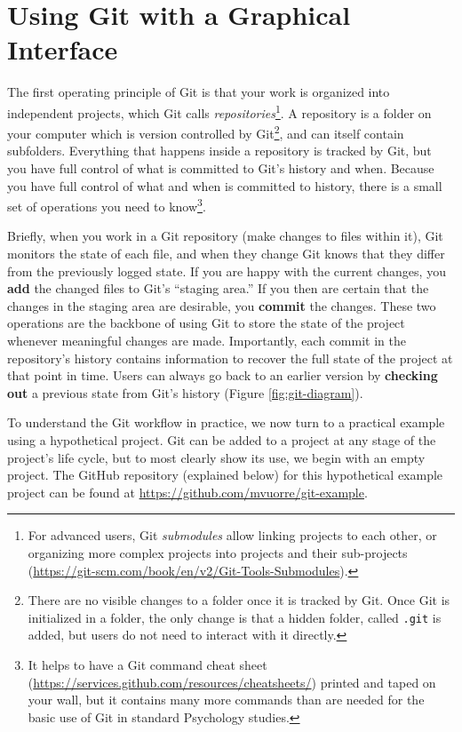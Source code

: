 \documentclass[
  american,
  ,doc,floatsintext]{apa6}
\begin{document}
\hypertarget{using-git-with-a-graphical-interface}{%
\section{Using Git with a Graphical Interface}\label{using-git-with-a-graphical-interface}}

The first operating principle of Git is that your work is organized into independent projects, which Git calls \emph{repositories}\footnote{For advanced users, Git \emph{submodules} allow linking projects to each other, or organizing more complex projects into projects and their sub-projects (\url{https://git-scm.com/book/en/v2/Git-Tools-Submodules}).}. A repository is a folder on your computer which is version controlled by Git\footnote{There are no visible changes to a folder once it is tracked by Git. Once Git is initialized in a folder, the only change is that a hidden folder, called \texttt{.git} is added, but users do not need to interact with it directly.}, and can itself contain subfolders. Everything that happens inside a repository is tracked by Git, but you have full control of what is committed to Git's history and when. Because you have full control of what and when is committed to history, there is a small set of operations you need to know\footnote{It helps to have a Git command cheat sheet (\url{https://services.github.com/resources/cheatsheets/}) printed and taped on your wall, but it contains many more commands than are needed for the basic use of Git in standard Psychology studies.}.

Briefly, when you work in a Git repository (make changes to files within it), Git monitors the state of each file, and when they change Git knows that they differ from the previously logged state. If you are happy with the current changes, you \textbf{add} the changed files to Git's ``staging area.'' If you then are certain that the changes in the staging area are desirable, you \textbf{commit} the changes. These two operations are the backbone of using Git to store the state of the project whenever meaningful changes are made. Importantly, each commit in the repository's history contains information to recover the full state of the project at that point in time. Users can always go back to an earlier version by \textbf{checking out} a previous state from Git's history (Figure \ref{fig:git-diagram}).

To understand the Git workflow in practice, we now turn to a practical example using a hypothetical project. Git can be added to a project at any stage of the project's life cycle, but to most clearly show its use, we begin with an empty project. The GitHub repository (explained below) for this hypothetical example project can be found at \url{https://github.com/mvuorre/git-example}.
\end{document}
